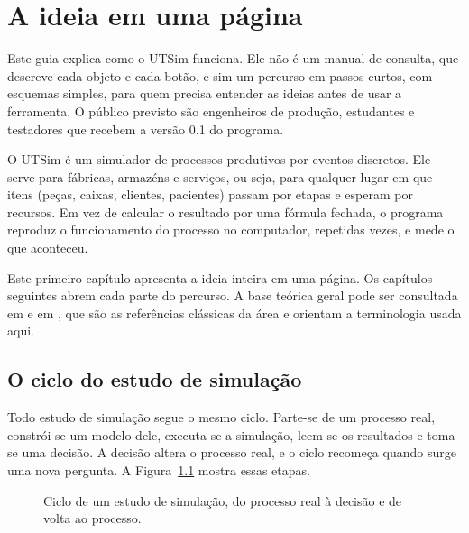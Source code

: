 \chapter{A ideia em uma página}
\label{cap-ideia}


Este guia explica como o UTSim funciona. Ele não é um manual de consulta, que descreve cada objeto e cada botão, e sim um percurso em passos curtos, com esquemas simples, para quem precisa entender as ideias antes de usar a ferramenta. O público previsto são engenheiros de produção, estudantes e testadores que recebem a versão 0.1 do programa.

O UTSim é um simulador de processos produtivos por eventos discretos. Ele serve para fábricas, armazéns e serviços, ou seja, para qualquer lugar em que itens (peças, caixas, clientes, pacientes) passam por etapas e esperam por recursos. Em vez de calcular o resultado por uma fórmula fechada, o programa reproduz o funcionamento do processo no computador, repetidas vezes, e mede o que aconteceu.

Este primeiro capítulo apresenta a ideia inteira em uma página. Os capítulos seguintes abrem cada parte do percurso. A base teórica geral pode ser consultada em \textcite{law2015} e em \textcite{banks2010}, que são as referências clássicas da área e orientam a terminologia usada aqui.

\section{O ciclo do estudo de simulação}

Todo estudo de simulação segue o mesmo ciclo. Parte-se de um processo real, constrói-se um modelo dele, executa-se a simulação, leem-se os resultados e toma-se uma decisão. A decisão altera o processo real, e o ciclo recomeça quando surge uma nova pergunta. A Figura~\ref{fig-ciclo} mostra essas etapas.

\begin{figure}[ht]
\centering
{}
\caption{Ciclo de um estudo de simulação, do processo real à decisão e de volta ao processo.}
\label{fig-ciclo}
\end{figure}

